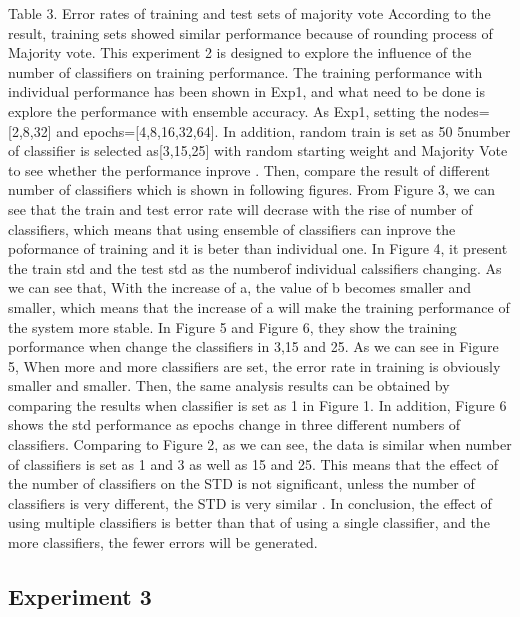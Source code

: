 \documentclass[a4paper, 12pt]{report}
\begin{document}
Table 3. Error rates of training and test sets of majority vote According to the result, training sets showed similar performance because of rounding process of Majority vote. 
This experiment 2 is designed to explore the influence of the number of classifiers on
training performance. The training performance with individual performance has been
shown in Exp1, and what need to be done is explore the performance with ensemble
accuracy. As Exp1, setting the nodes=[2,8,32] and epochs=[4,8,16,32,64]. In addition,
random train is set as 50%
5number of classifier is selected as[3,15,25] with random starting weight and Majority
Vote to see
whether the performance inprove . Then, compare the result of different
number of classifiers which is shown in following figures.
From Figure 3, we can see that the train and test error rate will decrase with the rise of
number of classifiers, which means that using ensemble of classifiers can inprove the
poformance of training and it is beter than individual one. In Figure 4, it present the train std and the test std as the numberof individual calssifiers
changing. As we can see that, With the increase of a, the value of b becomes smaller
and smaller, which means that the increase of a will make the training performance of
the system more stable. In Figure 5 and Figure 6, they show the training porformance when change the
classifiers in 3,15 and 25. As we can see in Figure 5, When more and more classifiers
are set, the error rate in training is obviously smaller and smaller. Then, the same
analysis results can be obtained by comparing the results when classifier is set as 1 in
Figure 1.
In addition, Figure 6 shows the std performance as epochs change in three
different numbers of classifiers. Comparing to Figure 2, as we can see, the data is
similar when number of classifiers is set as 1 and 3 as well as 15 and 25. This means
that the effect of the number of classifiers on the STD is not significant, unless the
number of classifiers is very different, the STD is very similar . In conclusion, the effect of using multiple classifiers is better than that of using a single
classifier, and the more classifiers, the fewer errors will be generated.



\subsection*{Experiment 3}
  
\end{document}

